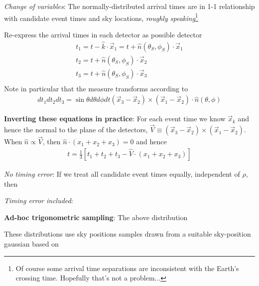 \documentclass[twocolumn,prd,nofootinbib]{revtex4}
\begin{document}
\begin{widetext}
\noindent \emph{Change of variables}: The normally-distributed arrival times are in 1-1 relationship with candidate
event times and sky locations, \emph{roughly speaking}\footnote{Of course some arrival time separations are inconsistent with the Earth's
crossing time.  Hopefully that's not a problem...}

Re-express the arrival times in each detector as possible detector
\begin{eqnarray}
t_1 = t - \hat{k}\cdot \vec{x}_1 = t + \hat{n}(\theta_S,\phi_S)\cdot \vec{x}_1 \\
t_2  = t + \hat{n}(\theta_S,\phi_S)\cdot \vec{x}_2 \\
t_3  = t + \hat{n}(\theta_S,\phi_S)\cdot \vec{x}_3 \\
\end{eqnarray}
Note in particular that the measure transforms according to
\begin{eqnarray}
 dt_1 dt_2 dt_3  = \sin\theta d\theta d\phi dt (\vec{x}_3-\vec{x}_2)\times(\vec{x}_1-\vec{x}_2)\cdot\hat{n}(\theta,\phi)
\end{eqnarray}

\begin{shaded}
\noindent \textbf{Inverting these equations in practice}: For each event time we know $\vec{x}_k$ and hence the normal
to the plane of the detectors, $\vec{V}\equiv (\vec{x}_3 -\vec{x}_2)\times(\vec{x}_1-\vec{x}_2)$.  When $\hat{n}\propto
\vec{V}$, then $\hat{n}\cdot (x_1+x_2+x_3)=0$ and hence
\begin{eqnarray}
t = \frac{1}{3}[t_1+t_2+t_3 - \hat{V}\cdot(x_1+x_2+x_3)] 
\end{eqnarray}

\noindent \emph{No timing error}: If we treat all candidate event times equally, independent of $\rho$, then 

\noindent \emph{Timing error included}:
\end{shaded}


\noindent \textbf{Ad-hoc trigonometric sampling}:  The above distribution

These distributions use sky positions samples drawn from a suitable sky-position gaussian \cite{2011CQGra..28j5021F}
based on 


\end{widetext}
\end{document}
